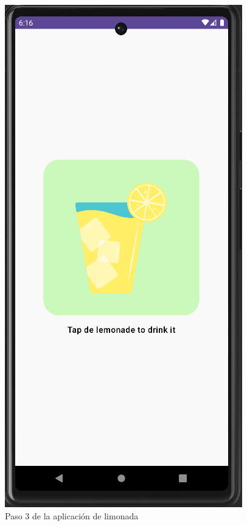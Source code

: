 \documentclass{article}
\begin{document}
    \begin{figure}[H]
        \centerline{\includegraphics[scale=0.2]{step3.png}}
        \caption{Paso 3 de la aplicación de limonada}
        \label{fig:step3}
    \end{figure}
\end{document}
